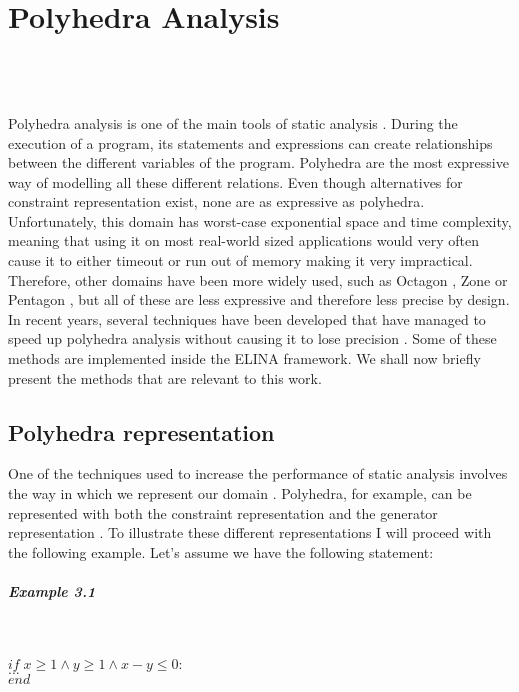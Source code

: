 
\chapter{Polyhedra Analysis}
\mbox{}\\
\mbox{}\\
\mbox{}\\
Polyhedra analysis is one of the main tools of static analysis \cite{cousot1977abstract}. During the execution of a program, its statements and expressions can create relationships between the different variables of the program. Polyhedra are the most expressive way of modelling all these different relations. Even though alternatives for constraint representation exist, none are as expressive as polyhedra. Unfortunately, this domain has worst-case exponential space and time complexity, meaning that using it on most real-world sized applications would very often cause it to either timeout or run out of memory making it very impractical. Therefore, other domains have been more widely used, such as Octagon \cite{mine2006octagon}, Zone \cite{mine2001new} or Pentagon \cite{logozzo2010pentagons}, but all of these are less expressive and therefore less precise by design. In recent years, several techniques have been developed that have managed to speed up polyhedra analysis without causing it to lose precision \cite{gange2016exploiting,jourdan2017sparsity,marechal2017efficient}. Some of these methods are implemented inside the ELINA framework. We shall now briefly present the methods that are relevant to this work.
\section{Polyhedra representation}
One of the techniques used to increase the performance of static analysis involves the way in which we represent our domain \cite{singh2015making}. Polyhedra, for example, can be represented with both the constraint representation and the generator representation \cite{motzkin1953double}. To illustrate these different representations I will proceed with the following example. Let's assume we have the following statement:
\paragraph{Example 3.1}\mbox{}\\
\begin{center}
	$if \; x\geq1\wedge y \geq 1 \wedge x - y \leq 0: $\\ 
	$...\;\;\;\;\;$\\
	$end \qquad\qquad\qquad\qquad\qquad\qquad$
\end{center}

